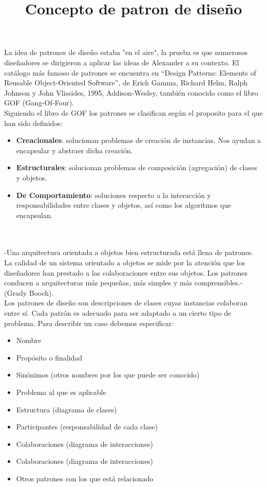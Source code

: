\documentclass[a4paper,11pt]{report}
\begin{document}
La idea de patrones de diseño estaba "en el aire", la prueba es que numerosos diseñadores se dirigieron a aplicar las ideas de Alexander a su contexto. El catálogo más famoso de patrones se encuentra en “Design Patterns: Elements of Reusable Object-Oriented Software”, de Erich Gamma, Richard Helm, Ralph Johnson y John Vlissides, 1995, Addison-Wesley, también conocido como el libro GOF (Gang-Of-Four).\\

Siguiendo el libro de GOF los patrones se clasifican según el proposito para el que han sido definidos:\\

\begin{itemize}
    \item{\textbf{Creacionales}: solucionan problemas de creación de instancias. Nos ayudan a encapsular y abstraer dicha creación.\\}
    \item{\textbf{Estructurales}: solucionan problemas de composición (agregación) de clases y objetos.\\
}
    \item{\textbf{De Comportamiento}: soluciones respecto a la interacción y responsabilidades entre clases y objetos, así como los algoritmos que encapsulan. \\
}
\end{itemize}


\title{\textbf{Concepto de patron de diseño}}\\
\\-Una arquitectura orientada a objetos bien estructurada está llena de patrones. La calidad de un sistema orientado a objetos se mide por la atención que los diseñadores han prestado a las colaboraciones entre sus objetos. Los patrones conducen a arquitecturas más pequeñas, más simples y más comprensibles.- (Grady Booch).\\
Los patrones de diseño son descripciones de clases cuyas instancias colaboran entre sí. Cada patrón es adecuado para ser adaptado a un cierto tipo de problema. Para describir un caso debemos especificar:
\begin{itemize}
    \item{Nombre}
    \item{Propósito o finalidad }
    \item{Sinónimos (otros nombres por los que puede ser conocido) }
    \item{Problema al que es aplicable }
    \item{Estructura (diagrama de clases) }
    \item{Participantes (responsabilidad de cada clase) }
    \item{Colaboraciones (diagrama de interacciones) }
    \item{Colaboraciones (diagrama de interacciones) }
    \item{Otros patrones con los que está relacionado }
\end{itemize}
\end{document}
